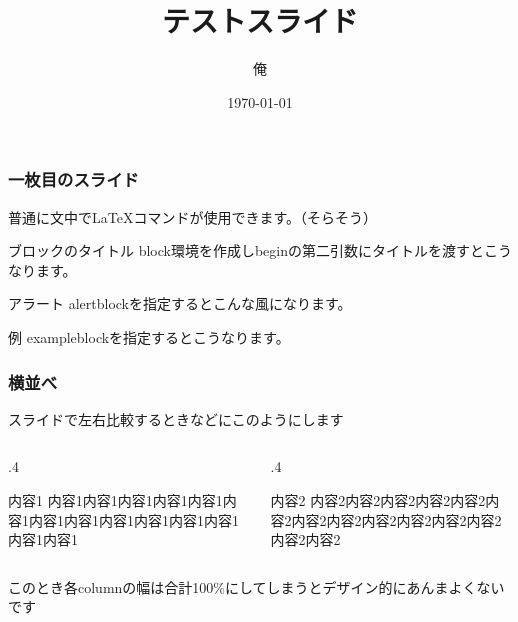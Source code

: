 \documentclass[dvipdfmx,ja=standard]{beamer}
\title{テストスライド}
\author{俺}
\date{\today}
\begin{document}
\begin{frame}
    \maketitle
\end{frame}

\begin{frame}
    
    \frametitle{一枚目のスライド}
    普通に文中で\LaTeX コマンドが使用できます。（そらそう）
    \begin{block}{ブロックのタイトル}
        block環境を作成しbeginの第二引数にタイトルを渡すとこうなります。
    \end{block}
    \begin{alertblock}{アラート}
        alertblockを指定するとこんな風になります。
    \end{alertblock}
    \begin{exampleblock}{例}
        exampleblockを指定するとこうなります。
    \end{exampleblock}
\end{frame}

\begin{frame}
    \frametitle{横並べ}
    スライドで左右比較するときなどにこのようにします
    \begin{columns}
        \begin{column}{.4\linewidth}
            \begin{block}{内容1}
                内容1内容1内容1内容1内容1内容1内容1内容1内容1内容1内容1内容1内容1内容1
            \end{block}
        \end{column}
        \begin{column}{.4\linewidth}
            \begin{block}{内容2}
                内容2内容2内容2内容2内容2内容2内容2内容2内容2内容2内容2内容2内容2内容2
            \end{block}
        \end{column}
    \end{columns}
    このとき各columnの幅は合計100\%にしてしまうとデザイン的にあんまよくないです
\end{frame}
\end{document}

